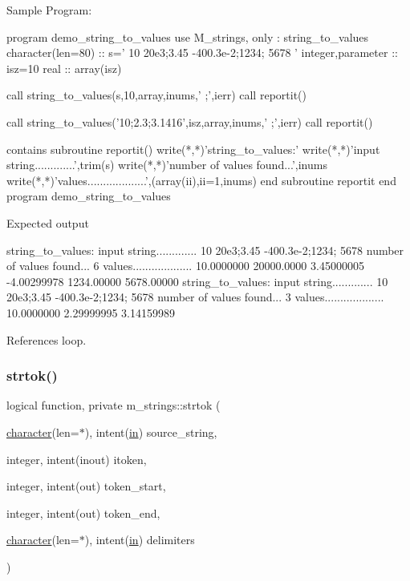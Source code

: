 \begin{DoxyVerb}Sample Program:

  program demo_string_to_values
   use M_strings, only : string_to_values
   character(len=80)  :: s=' 10 20e3;3.45 -400.3e-2;1234; 5678 '
   integer,parameter  :: isz=10
   real               :: array(isz)

   call string_to_values(s,10,array,inums,' ;',ierr)
   call reportit()

   call string_to_values('10;2.3;3.1416',isz,array,inums,' ;',ierr)
   call reportit()

   contains
      subroutine reportit()
         write(*,*)'string_to_values:'
         write(*,*)'input string.............',trim(s)
         write(*,*)'number of values found...',inums
         write(*,*)'values...................',(array(ii),ii=1,inums)
      end subroutine reportit
  end program demo_string_to_values

Expected output

 string_to_values:
 input string............. 10 20e3;3.45 -400.3e-2;1234; 5678
 number of values found...           6
 values...................   10.0000000  20000.0000  3.45000005  -4.00299978  1234.00000  5678.00000
 string_to_values:
 input string............. 10 20e3;3.45 -400.3e-2;1234; 5678
 number of values found...           3
 values...................   10.0000000  2.29999995  3.14159989 \end{DoxyVerb}
 

References loop.

\mbox{\label{namespacem__strings_a9a923829f31ea70ecada6d214536a704}} 
\subsubsection{\texorpdfstring{strtok()}{strtok()}}
{\footnotesize\ttfamily logical function, private m\+\_\+strings\+::strtok (\begin{DoxyParamCaption}\item[{\hyperlink{option__stopwatch_83_8txt_abd4b21fbbd175834027b5224bfe97e66}{character}(len=$\ast$), intent(\hyperlink{M__journal_83_8txt_afce72651d1eed785a2132bee863b2f38}{in})}]{source\+\_\+string,  }\item[{integer, intent(inout)}]{itoken,  }\item[{integer, intent(out)}]{token\+\_\+start,  }\item[{integer, intent(out)}]{token\+\_\+end,  }\item[{\hyperlink{option__stopwatch_83_8txt_abd4b21fbbd175834027b5224bfe97e66}{character}(len=$\ast$), intent(\hyperlink{M__journal_83_8txt_afce72651d1eed785a2132bee863b2f38}{in})}]{delimiters }\end{DoxyParamCaption})\hspace{0.3cm}{\ttfamily [private]}}




